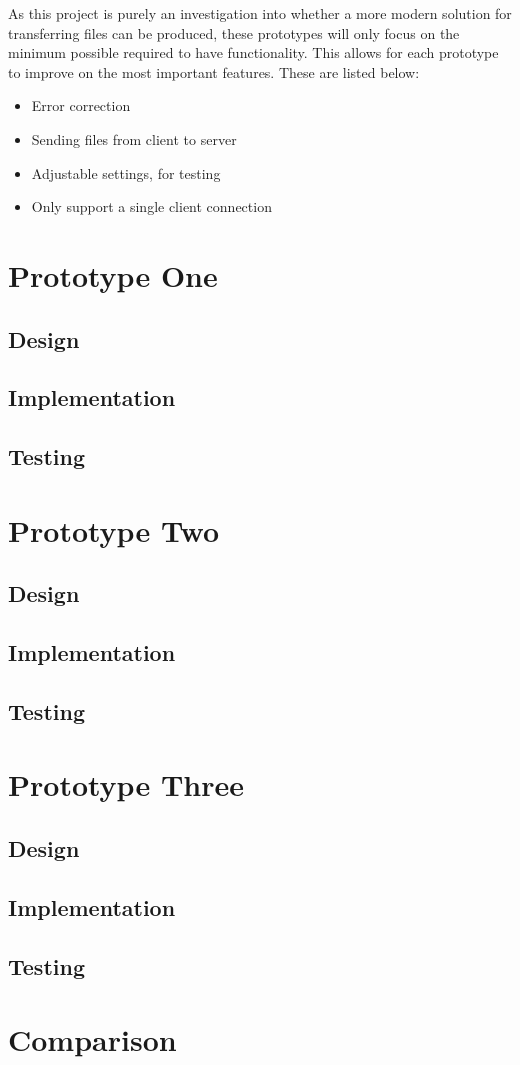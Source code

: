 As this project is purely an investigation into whether a more modern solution for transferring files can be produced, these prototypes will only focus on the minimum possible required to have functionality. This allows for each prototype to improve on the most important features. These are listed below:

\begin{itemize}
    \item Error correction
    \item Sending files from client to server
    \item Adjustable settings, for testing
    \item Only support a single client connection
\end{itemize}


\section{Prototype One}
\subsection{Design}
\subsection{Implementation}
\subsection{Testing}


\section{Prototype Two}
\subsection{Design}
\subsection{Implementation}
\subsection{Testing}


\section{Prototype Three}
\subsection{Design}
\subsection{Implementation}
\subsection{Testing}


\section{Comparison}
